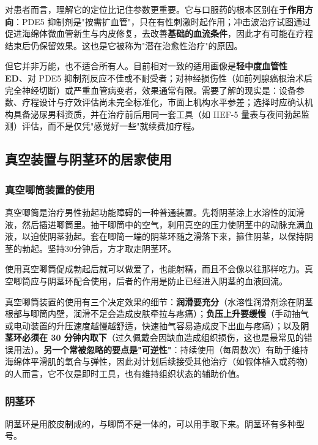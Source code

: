 \documentclass[12pt,a4paper,twoside]{ctexbook}
\begin{document}
对患者而言，理解它的定位比记住参数更重要。它与口服药的根本区别在于\textbf{作用方向}：PDE5 抑制剂是"按需扩血管"，只在有性刺激时起作用；冲击波治疗试图通过促进海绵体微血管新生与内皮修复，去改善\textbf{基础的血流条件}，因此才有可能在疗程结束后仍保留效果。这也是它被称为"潜在治愈性治疗"的原因。

但它并非万能，也不适合所有人。目前相对一致的适用画像是\textbf{轻中度血管性 ED}、对 PDE5 抑制剂反应不佳或不耐受者；对神经损伤性（如前列腺癌根治术后完全神经切断）或严重血管病变者，效果通常有限。需要了解的现实是：设备参数、疗程设计与疗效评估尚未完全标准化，市面上机构水平参差；选择时应确认机构具备泌尿男科资质，并在治疗前后用同一套工具（如 IIEF-5 量表与夜间勃起监测）评估，而不是仅凭"感觉好一些"就续费加疗程。

\subsection{真空装置与阴茎环的居家使用}

\subsubsection{真空唧筒装置的使用}

真空唧筒是治疗男性勃起功能障碍的一种普通装置。先将阴茎涂上水溶性的润滑液，然后插进唧筒里。抽干唧筒中的空气，利用真空的压力使阴茎中的动脉充满血液，以迫使阴茎勃起。套在唧筒一端的阴茎环随之滑落下来，箍住阴茎，以保持阴茎的勃起。坚持30分钟后，方才取走阴茎环。

使用真空唧筒促成勃起后就可以做爱了，也能射精，而且不会像以往那样吃力。真空唧筒应与阴茎环配合使用，后者的作用是防止已经进入阴茎的血液回流。


真空唧筒装置的使用有三个决定效果的细节：\textbf{润滑要充分}（水溶性润滑剂涂在阴茎根部与唧筒内壁，润滑不足会造成皮肤牵拉与疼痛）；\textbf{负压上升要缓慢}（手动抽气或电动装置的升压速度越慢越舒适，快速抽气容易造成皮下出血与疼痛）；以及\textbf{阴茎环必须在 30 分钟内取下}（过久佩戴会因缺血造成组织损伤，这也是最常见的错误用法）。\textbf{另一个常被忽略的要点是"可逆性"}：持续使用（每周数次）有助于维持海绵体平滑肌的氧合与弹性，因此对计划后续接受其他治疗（如假体植入或药物）的人而言，它不仅是即时工具，也有维持组织状态的辅助价值。

\subsubsection{阴茎环}

阴茎环是用胶皮制成的，与唧筒不是一体的，可以用手取下来。阴茎环有多种型号。
\end{document}
